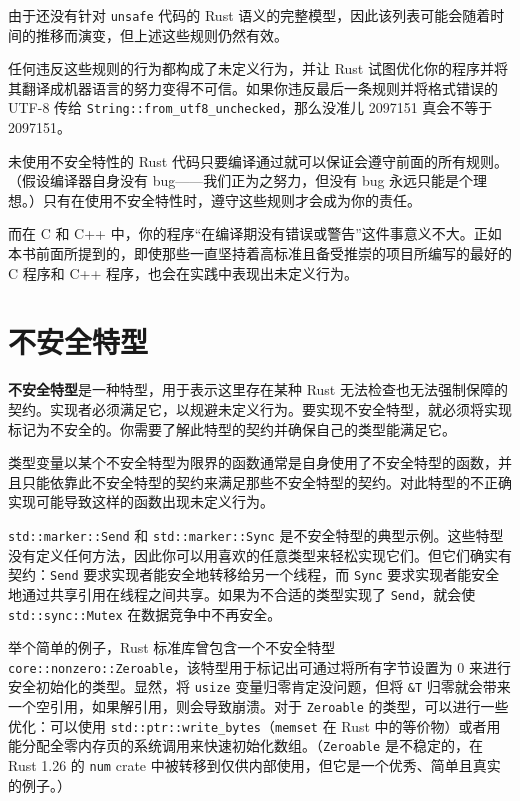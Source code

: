由于还没有针对 \texttt{unsafe} 代码的 Rust 语义的完整模型，因此该列表可能会随着时间的推移而演变，但上述这些规则仍然有效。

任何违反这些规则的行为都构成了未定义行为，并让 Rust 试图优化你的程序并将其翻译成机器语言的努力变得不可信。如果你违反最后一条规则并将格式错误的 UTF-8 传给 \texttt{String::from\_utf8\_unchecked}，那么没准儿 2097151 真会不等于 2097151。

未使用不安全特性的 Rust 代码只要编译通过就可以保证会遵守前面的所有规则。（假设编译器自身没有 bug——我们正为之努力，但没有 bug 永远只能是个理想。）只有在使用不安全特性时，遵守这些规则才会成为你的责任。

而在 C 和 C++ 中，你的程序“在编译期没有错误或警告”这件事意义不大。正如本书前面所提到的，即使那些一直坚持着高标准且备受推崇的项目所编写的最好的 C 程序和 C++ 程序，也会在实践中表现出未定义行为。

\section{不安全特型}

\textbf{不安全特型}是一种特型，用于表示这里存在某种 Rust 无法检查也无法强制保障的契约。实现者必须满足它，以规避未定义行为。要实现不安全特型，就必须将实现标记为不安全的。你需要了解此特型的契约并确保自己的类型能满足它。

类型变量以某个不安全特型为限界的函数通常是自身使用了不安全特型的函数，并且只能依靠此不安全特型的契约来满足那些不安全特型的契约。对此特型的不正确实现可能导致这样的函数出现未定义行为。

\texttt{std::marker::Send} 和 \texttt{std::marker::Sync} 是不安全特型的典型示例。这些特型没有定义任何方法，因此你可以用喜欢的任意类型来轻松实现它们。但它们确实有契约：\texttt{Send} 要求实现者能安全地转移给另一个线程，而 \texttt{Sync} 要求实现者能安全地通过共享引用在线程之间共享。如果为不合适的类型实现了 \texttt{Send}，就会使 \texttt{std::sync::Mutex} 在数据竞争中不再安全。

举个简单的例子，Rust 标准库曾包含一个不安全特型 \texttt{core::nonzero::Zeroable}，该特型用于标记出可通过将所有字节设置为 0 来进行安全初始化的类型。显然，将 \texttt{usize} 变量归零肯定没问题，但将 \texttt{\&T} 归零就会带来一个空引用，如果解引用，则会导致崩溃。对于 \texttt{Zeroable} 的类型，可以进行一些优化：可以使用 \texttt{std::ptr::write\_bytes}（\texttt{memset} 在 Rust 中的等价物）或者用能分配全零内存页的系统调用来快速初始化数组。（\texttt{Zeroable} 是不稳定的，在 Rust 1.26 的 \texttt{num} crate 中被转移到仅供内部使用，但它是一个优秀、简单且真实的例子。）

